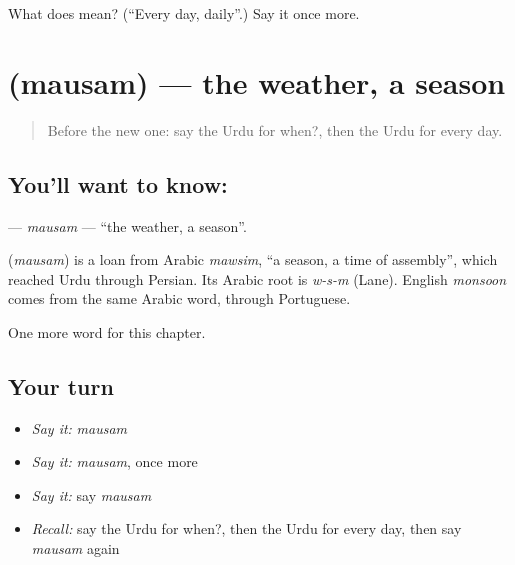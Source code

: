 \begin{tcolorbox}[breakable,colback=teal!4,colframe=teal!35!black,title={Before you move on}]
What does  mean? (\textquotedblleft{}Every day, daily\textquotedblright{}.) Say it once more.
\end{tcolorbox}
\section[\texorpdfstring{\ur{موسم} (mausam)}{موسم (mausam)}]{ (mausam) — the weather, a season}

\label{lesson:UR-C94-mausam}



\begin{quote}
Before the new one: say the Urdu for when?, then the Urdu for every day.
\end{quote}

\subsection*{You'll want to know: }
\textbf{} — \emph{mausam} — \textquotedblleft{}the weather, a season\textquotedblright{}.

\begin{cousinweb}
\textbf{} (\emph{mausam}) is a loan from Arabic \emph{mawsim}, \textquotedblleft{}a season, a time of assembly\textquotedblright{}, which reached Urdu through Persian. Its Arabic root is \emph{w-s-m} (Lane). English \emph{monsoon} comes from the same Arabic word, through Portuguese.
\end{cousinweb}

\begin{grammarlens}[title={What you've built}]
One more word for this chapter.
\end{grammarlens}

\subsection*{Your turn}
\begin{itemize}
\raggedright
  \item \emph{Say it:} \emph{mausam}
  \item \emph{Say it:} \emph{mausam}, once more
  \item \emph{Say it:} say \emph{mausam}
  \item \emph{Recall:} say the Urdu for when?, then the Urdu for every day, then say \emph{mausam} again
\end{itemize}

